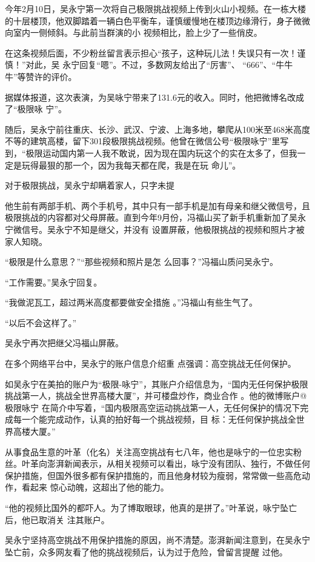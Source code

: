 \documentclass{article}
\begin{document}
今年2月10日，吴永宁第一次将自己极限挑战视频上传到火山小视频。在一栋大楼的十层楼顶，他双脚踏着一辆白色平衡车，谨慎缓慢地在楼顶边缘滑行，身子微微向室内一侧倾斜。与此前当群演的小
视频相比，脸上少了一些俏皮。 

在这条视频后面，不少粉丝留言表示担心“孩子，这种玩儿法！失误只有一次！谨慎！”对此，吴
\newpage
永宁回复“嗯”。不过，多数网友给出了“厉害”、
“666”、“牛牛牛”等赞许的评价。 

据媒体报道，这次表演，为吴咏宁带来了131.6元的收入。同时，他把微博名改成了“极限咏
宁”。 

随后，吴永宁前往重庆、长沙、武汉、宁波、上海多地，攀爬从100米至468米高度不等的建筑高楼，留下301段极限挑战视频。他曾在微信公号“极限咏宁”里写到，“极限运动国内第一人我不敢说，因为现在国内玩这个的实在太多了，但我一定是玩得最狠的那一个，因为我每天都在爬，我是在玩
命儿”。 

对于极限挑战，吴永宁却瞒着家人，只字未提

他生前有两部手机、两个手机号，其中只有一部手机是加有母亲和继父微信号，且极限挑战的内容都对父母屏蔽。直到今年9月份，冯福山买了新手机重新加了吴永宁微信号。吴永宁不知是继父，并没有
\newpage
设置屏蔽，他极限挑战的视频和照片才被家人知晓。
 

“极限是什么意思？”“那些视频和照片是怎
么回事？”冯福山质问吴永宁。 


“工作需要。”吴永宁回复。 

“我做泥瓦工，超过两米高度都要做安全措施
。”冯福山有些生气了。 


“以后不会这样了。” 


吴永宁再次把继父冯福山屏蔽。 

在多个网络平台中，吴永宁的账户信息介绍重
点强调：高空挑战无任何保护。 

如吴永宁在美拍的账户为“极限-咏宁”，其账户介绍信息为，“国内无任何保护极限挑战第一人，挑战全世界高楼大厦”，并可楼盘炒作，商业合作
\newpage
。他的微博账户@极限咏宁 在简介中写着，“国内极限高空运动挑战第一人，无任何保护的情况下完成每一个能完成动作，认真的拍好每一个挑战视频，目
标：无任何保护挑战全世界高楼大厦。” 

从事食品生意的叶革（化名）关注高空挑战有七八年，他也是咏宁的一位忠实粉丝。叶革向澎湃新闻表示，从相关视频可以看出，咏宁没有团队、独行，不做任何保护措施，但国外很多都有保护措施的，而且他身材较为瘦弱，常常做一些高危动作，看起来
惊心动魄，这超出了他的能力。 

“他的视频比国外的都吓人。为了博取眼球，他真的是拼了。”叶革说，咏宁坠亡后，他已取消关
注其账户。 

吴永宁坚持高空挑战不用保护措施的原因，尚不清楚。澎湃新闻注意到，在吴永宁坠亡前，众多网友看了他的挑战视频后，认为过于危险，曾留言提醒
过他。 
\end{document}
